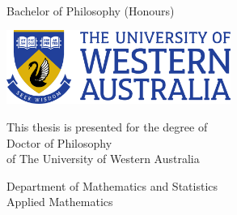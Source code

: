 
\begin{titlepage}

\centering

\vspace*{6em}

{\Huge\bfseries
  \scalebox{0.97}{\titlefirstline} \\
  \scalebox{0.93}{\titlesecondline} \\
}

\vfill

{\Huge
  \scalebox{0.95}{\theauthor} \\
}
{\Large
  Bachelor of Philosophy (Honours) \\
}

\vfill

\includegraphics[width=0.55\textwidth]{frontmatter/uwa-logo}

\vspace{2.5em}

{\LARGE
  This thesis is presented for the degree of \\
  Doctor of Philosophy \\
  of The University of Western Australia \\
}

\vspace{2em}

{\Large
  Department of Mathematics and Statistics \\
  Applied Mathematics \\
}

\vspace{1.5em}

{\huge
  \theyear \\
}

\vspace{3em}

\end{titlepage}

